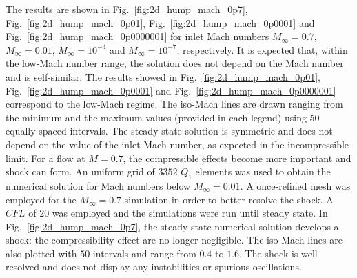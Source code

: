 \documentclass{anstrans}
\newcommand{\fig}[1]{Fig.~\ref{#1}}                      %
\begin{document}
The results are shown in \fig{fig:2d_hump_mach_0p7}, \fig{fig:2d_hump_mach_0p01}, \fig{fig:2d_hump_mach_0p0001} and \fig{fig:2d_hump_mach_0p0000001} for inlet Mach numbers $M_{\infty}=0.7$, $M_{\infty}=0.01$, $M_{\infty}=10^{-4}$ and $M_{\infty}=10^{-7}$, respectively. It is expected that, within the low-Mach number range, the solution does not depend on the Mach number and is self-similar. The results showed in \fig{fig:2d_hump_mach_0p01}, \fig{fig:2d_hump_mach_0p0001} and \fig{fig:2d_hump_mach_0p0000001} correspond to the low-Mach regime. The iso-Mach lines are drawn ranging from the minimum and the maximum values (provided in each legend) using 50 equally-spaced intervals. The steady-state solution is symmetric and does not depend on the value of the inlet Mach number, as expected in the incompressible limit. 
%
For a flow at $M=0.7$, the compressible effects become more important and shock can form. An uniform grid of $3352$ $Q_1$ elements was used to obtain the numerical solution for Mach numbers below $M_{\infty}=0.01$. A once-refined mesh was employed for the $M_{\infty}=0.7$ simulation in order to better resolve the shock. A $CFL$ of 20 was employed and the simulations were run until steady state. 
%
In \fig{fig:2d_hump_mach_0p7}, the steady-state numerical solution develops a shock: the compressibility effect are no longer negligible. The iso-Mach lines are also plotted with $50$ intervals and range from $0.4$ to $1.6$. The shock is well resolved and does not display any instabilities or spurious oscillations. 
%
\end{document}
